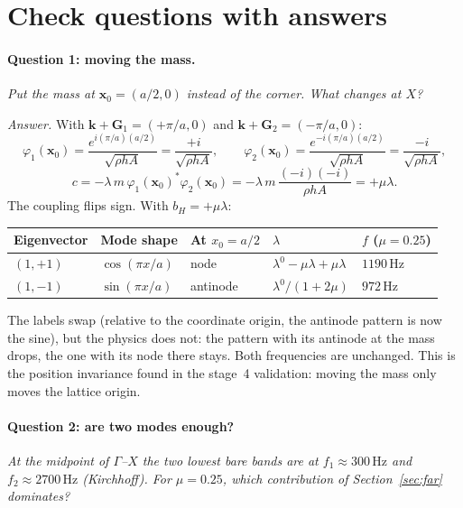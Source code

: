 \section{Check questions with answers}

\paragraph{Question 1: moving the mass.} \emph{Put the mass at
$\mathbf{x}_0 = (a/2, 0)$ instead of the corner. What changes at $X$?}

\emph{Answer.} With $\mathbf{k} + \mathbf{G}_1 = (+\pi/a, 0)$ and
$\mathbf{k} + \mathbf{G}_2 = (-\pi/a, 0)$:
\begin{equation}
  \varphi_1(\mathbf{x}_0) = \frac{e^{i(\pi/a)(a/2)}}{\sqrt{\rho h A}} = \frac{+i}{\sqrt{\rho h A}}, \qquad
  \varphi_2(\mathbf{x}_0) = \frac{e^{-i(\pi/a)(a/2)}}{\sqrt{\rho h A}} = \frac{-i}{\sqrt{\rho h A}},
\end{equation}
\begin{equation}
  c = -\lambda\, m\, \varphi_1(\mathbf{x}_0)^* \varphi_2(\mathbf{x}_0)
    = -\lambda\, m\, \frac{(-i)(-i)}{\rho h A} = +\mu\lambda .
\end{equation}
The coupling flips sign. With $b_H = +\mu\lambda$:
\begin{center}
\begin{tabular}{|l|l|l|l|l|}
\hline
Eigenvector & Mode shape & At $x_0 = a/2$ & $\lambda$ & $f$ ($\mu = 0.25$) \\
\hline
$(1,+1)$ & $\cos(\pi x/a)$ & node & $\lambda^0 - \mu\lambda + \mu\lambda$ & $1190\,\mathrm{Hz}$ \\
$(1,-1)$ & $\sin(\pi x/a)$ & antinode & $\lambda^0/(1+2\mu)$ & $972\,\mathrm{Hz}$ \\
\hline
\end{tabular}
\end{center}
The labels swap (relative to the coordinate origin, the antinode pattern is
now the sine), but the physics does not: the pattern with its antinode at the
mass drops, the one with its node there stays. Both frequencies are
unchanged. This is the position invariance found in the stage~4 validation:
moving the mass only moves the lattice origin.

\paragraph{Question 2: are two modes enough?} \emph{At the midpoint of
$\Gamma$--$X$ the two lowest bare bands are at $f_1 \approx 300\,\mathrm{Hz}$
and $f_2 \approx 2700\,\mathrm{Hz}$ (Kirchhoff). For $\mu = 0.25$, which
contribution of Section~\ref{sec:far} dominates?}

